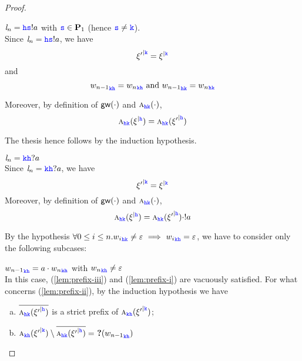 \begin{proof}
\begin{description}
\item
       $\elle_n =\HH\tts!a$ with $\tts \in \roles_1$ (hence $\tts\neq\KK$).\\
Since $\elle_n =\HH\tts!a$, we have  
\begin{equation}
\label{eq:weq2}
\restrictup{\xi'}{\KK}=\restrictup{\xi}{\KK}
\end{equation}
and 
\begin{equation}
\label{eq:weqw}
{w_{n-1}}_{\KK\HH} = {w_{n}}_{\KK\HH} \text{ and } {w_{n-1}}_{\HH\KK} = {w_{n}}_{\HH\KK}
\end{equation}

Moreover, by definition of $\gateway{\cdot}$ and $\symb{\HH\KK}{\cdot}$, 
\begin{equation}
\label{eq:xipxi2}
\symb{\HH\KK}{\restrictup{\xi}{\HH}} = \symb{\HH\KK}{\restrictup{\xi'}{\HH}}
\end{equation}

The thesis hence follows by the induction hypothesis.


\item
       $\elle_n =\KK\HH?a$\\
Since $\elle_n =\KK\HH?a$, we have 
\begin{equation}
\label{eq:weq3}
\restrictup{\xi'}{\KK}=\restrictup{\xi}{\KK}
\end{equation}
Moreover, by definition of $\gateway{\cdot}$ and $\symb{\HH\KK}{\cdot}$, 
\begin{equation}
\label{eq:xipxi3}
\symb{\HH\KK}{\restrictup{\xi}{\HH}} = \symb{\HH\KK}{\restrictup{\xi'}{\HH}}\cdot !a
\end{equation}

By the hypothesis
 $\forall 0\leq i\leq n. {w_i}_{\HH\KK}\neq \varepsilon \implies {w_i}_{\KK\HH}= \varepsilon$,
we have to consider only the following subcases:

\begin{description}
\item
      ${w_{n-1}}_{\KK\HH} = a\cdot {w_{n}}_{\KK\HH}$ with ${w_{n}}_{\KK\HH}\neq \varepsilon$\\
In this case, (\ref{lem:prefix-iii}) and (\ref{lem:prefix-i}) are vacuously satisfied. For what concerns
(\ref{lem:prefix-ii}),
by the induction hypothesis we have
\begin{enumerate}[a)]
\item 
\label{l:aa}
$\Dual{\symb{\HH\KK}{\restrictup{\xi'}{\HH}}}$
 is a strict prefix of
$\symb{\KK\HH}{\restrictup{\xi'}{\KK}}$;
\item
\label{l:bb}
$\symb{\KK\HH}{\restrictup{\xi'}{\KK}}\setminus \Dual{\symb{\HH\KK}{\restrictup{\xi'}{\HH}}} = \qm({{w_{n-1}}_{\KK\HH}})$
\end{enumerate}


\end{description}
\end{description}
\end{proof}
